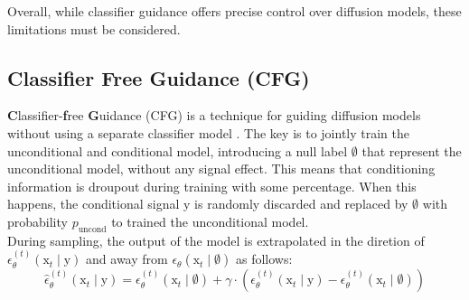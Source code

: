 \noindent Overall, while classifier guidance offers precise control over diffusion models,
these limitations must be considered.


\subsection{Classifier Free Guidance (CFG)}

\textbf{C}lassifier-\textbf{f}ree \textbf{G}uidance (CFG) is a technique for guiding diffusion models without using a separate classifier model \cite{Ho2022ClassifierFreeDG}. The key is to jointly train the unconditional and conditional model, introducing a null label $\emptyset$ that 
represent the unconditional model, without any signal effect. This means
that conditioning information is droupout during training with some percentage. When this happens, the conditional signal $\mathrm{y}$ is randomly discarded and replaced by $\emptyset$ with probability $p_{\text{uncond}}$ to trained the unconditional model. \\

\noindent During sampling, the output of the model is extrapolated in the diretion of
$\epsilon_{\theta}^{(t)}(\mathrm{x}_{t}\mid\mathrm{y})$ and away from
$\epsilon_{\theta}(\mathrm{x}_{t}\mid\emptyset)$ as follows: \\

\begin{equation}\label{eqn:cfg}
    \hat{\epsilon}_{\theta}^{(t)}(\mathrm{x}_{t}\mid\mathrm{y}) = \epsilon_{\theta}^{(t)}(\mathrm{x}_{t}\mid\emptyset) + \gamma \cdot (\epsilon_{\theta}^{(t)}(\mathrm{x}_{t}\mid\mathrm{y}) - \epsilon_{\theta}^{(t)}(\mathrm{x}_{t}\mid\emptyset))
\end{equation}





